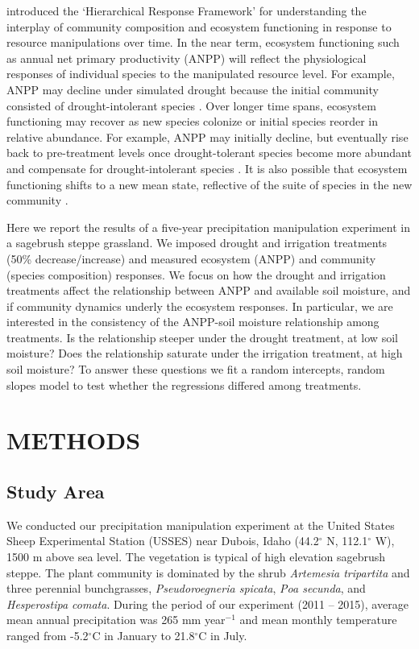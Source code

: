 \documentclass[fleqn,10pt]{wlpeerj} %
\begin{document}
\citet{Smith2009} introduced the `Hierarchical Response Framework' for
understanding the interplay of community composition and ecosystem
functioning in response to resource manipulations over time. In the near
term, ecosystem functioning such as annual net primary productivity
(ANPP) will reflect the physiological responses of individual species to
the manipulated resource level. For example, ANPP may decline under
simulated drought because the initial community consisted of
drought-intolerant species \citep{Hoover2014}. Over longer time spans,
ecosystem functioning may recover as new species colonize or initial
species reorder in relative abundance. For example, ANPP may initially
decline, but eventually rise back to pre-treatment levels once
drought-tolerant species become more abundant and compensate for
drought-intolerant species \citep{Hoover2014}. It is also possible that
ecosystem functioning shifts to a new mean state, reflective of the
suite of species in the new community \citep{Knapp2012}.

Here we report the results of a five-year precipitation manipulation
experiment in a sagebrush steppe grassland. We imposed drought and
irrigation treatments (50\% decrease/increase) and measured ecosystem
(ANPP) and community (species composition) responses. We focus on how
the drought and irrigation treatments affect the relationship between
ANPP and available soil moisture, and if community dynamics underly the
ecosystem responses. In particular, we are interested in the consistency
of the ANPP-soil moisture relationship among treatments. Is the
relationship steeper under the drought treatment, at low soil moisture?
Does the relationship saturate under the irrigation treatment, at high
soil moisture? To answer these questions we fit a random intercepts,
random slopes model to test whether the regressions differed among
treatments.

\section{METHODS}\label{methods}

\subsection{Study Area}\label{study-area}

We conducted our precipitation manipulation experiment at the United
States Sheep Experimental Station (USSES) near Dubois, Idaho
(44.2\(^{\circ}\) N, 112.1\(^{\circ}\) W), 1500 m above sea level. The
vegetation is typical of high elevation sagebrush steppe. The plant
community is dominated by the shrub \emph{Artemesia tripartita} and
three perennial bunchgrasses, \emph{Pseudoroegneria spicata}, \emph{Poa
secunda}, and \emph{Hesperostipa comata}. During the period of our
experiment (2011 -- 2015), average mean annual precipitation was 265 mm
year\(\phantom{}^{-1}\) and mean monthly temperature ranged from
-5.2\(^{\circ}\)C in January to 21.8\(^{\circ}\)C in July.
\end{document}
